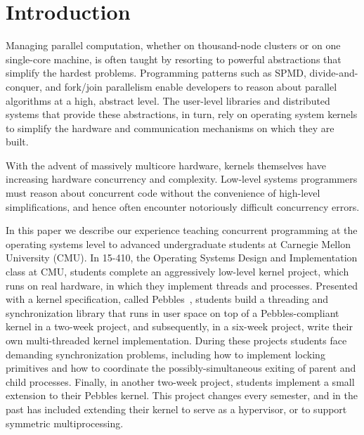 \section{Introduction}

Managing parallel computation, whether on thousand-node clusters or on one single-core machine, is often taught by resorting to powerful abstractions that simplify the hardest problems.
Programming patterns such as SPMD, divide-and-conquer, and fork/join parallelism enable developers to reason about parallel algorithms at a high, abstract level.
The user-level libraries and distributed systems that provide these abstractions, in turn, rely on operating system kernels to simplify the hardware and communication mechanisms on which they are built. %

With the advent of massively multicore hardware,
kernels themselves have increasing hardware concurrency and complexity. %
Low-level systems programmers must reason about concurrent code without the convenience of high-level simplifications, and hence often encounter notoriously difficult concurrency errors.

In this paper we describe our experience teaching concurrent programming at the operating systems level to advanced undergraduate students at Carnegie Mellon University (CMU).
In 15-410, the Operating Systems Design and Implementation class at CMU, students complete an aggressively low-level kernel project, which runs on real hardware, in which they implement threads and processes.
Presented with a kernel specification, called Pebbles~\cite{kspec}, students build a threading and synchronization library that runs in user space on top of a Pebbles-compliant kernel in a two-week project, and subsequently, in a six-week project, write their own multi-threaded kernel implementation.
During these projects students face demanding synchronization problems, including how to implement locking primitives and how to coordinate the possibly-simultaneous exiting of parent and child processes.
Finally, in another two-week project, students implement a small extension to their Pebbles kernel. This project changes every semester, and in the past has included extending their kernel to serve as a hypervisor, or to support symmetric multiprocessing.

